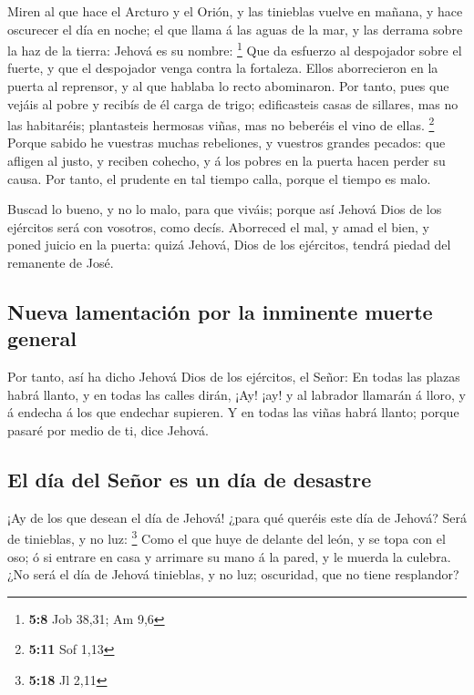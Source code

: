  Miren al que hace el Arcturo y el Orión, y las tinieblas
vuelve en mañana, y hace oscurecer el día en noche; el que llama á las
aguas de la mar, y las derrama sobre la haz de la tierra: Jehová es su
nombre: \footnote{\textbf{5:8} Job 38,31; Am 9,6}  Que da
esfuerzo al despojador sobre el fuerte, y que el despojador venga contra
la fortaleza.  Ellos aborrecieron en la puerta al
reprensor, y al que hablaba lo recto abominaron.  Por
tanto, pues que vejáis al pobre y recibís de él carga de trigo;
edificasteis casas de sillares, mas no las habitaréis; plantasteis
hermosas viñas, mas no beberéis el vino de ellas. \footnote{\textbf{5:11}
  Sof 1,13}  Porque sabido he vuestras muchas rebeliones, y
vuestros grandes pecados: que afligen al justo, y reciben cohecho, y á
los pobres en la puerta hacen perder su causa.  Por tanto,
el prudente en tal tiempo calla, porque el tiempo es malo.

 Buscad lo bueno, y no lo malo, para que viváis; porque así
Jehová Dios de los ejércitos será con vosotros, como decís.
 Aborreced el mal, y amad el bien, y poned juicio en la
puerta: quizá Jehová, Dios de los ejércitos, tendrá piedad del remanente
de José.

\hypertarget{nueva-lamentaciuxf3n-por-la-inminente-muerte-general}{%
\subsection{Nueva lamentación por la inminente muerte
general}\label{nueva-lamentaciuxf3n-por-la-inminente-muerte-general}}

 Por tanto, así ha dicho Jehová Dios de los ejércitos, el
Señor: En todas las plazas habrá llanto, y en todas las calles dirán,
¡Ay! ¡ay! y al labrador llamarán á lloro, y á endecha á los que endechar
supieren.  Y en todas las viñas habrá llanto; porque pasaré
por medio de ti, dice Jehová.

\hypertarget{el-duxeda-del-seuxf1or-es-un-duxeda-de-desastre}{%
\subsection{El día del Señor es un día de
desastre}\label{el-duxeda-del-seuxf1or-es-un-duxeda-de-desastre}}

 ¡Ay de los que desean el día de Jehová! ¿para qué queréis
este día de Jehová? Será de tinieblas, y no luz: \footnote{\textbf{5:18}
  Jl 2,11}  Como el que huye de delante del león, y se topa
con el oso; ó si entrare en casa y arrimare su mano á la pared, y le
muerda la culebra.  ¿No será el día de Jehová tinieblas, y
no luz; oscuridad, que no tiene resplandor?

